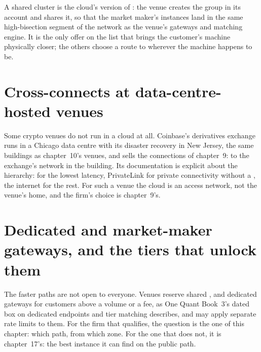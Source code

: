 A shared cluster  is the cloud's version of : the venue creates the group in its account and shares it, so that the
market maker's instances land in the same high-bisection segment of the network as the venue's gateways and matching engine. It is the only
offer on the list that brings the customer's machine physically closer; the others choose a route to wherever the machine happens to be.

\section{Cross-connects at data-centre-hosted venues}

Some crypto venues do not run in a cloud at all. Coinbase's derivatives exchange runs in a Chicago data centre with its disaster recovery in New
Jersey, the same buildings as chapter~10's venues, and sells the connections of chapter~9:  to the exchange's network in the building.
Its documentation is explicit about the hierarchy:  for the lowest latency, PrivateLink for private connectivity without a
, the internet for the rest. For such a venue the cloud is an access network, not the venue's home, and the firm's choice is chapter~9's.

\section{Dedicated and market-maker gateways, and the tiers that unlock them}

The faster paths are not open to everyone. Venues reserve shared ,  and dedicated gateways for customers above a
volume or a fee, as One Quant Book~3's dated box on dedicated endpoints and tier matching describes, and may apply separate rate limits to them.
For the firm that qualifies, the question is the one of this chapter: which path, from which zone. For the one that does not, it is chapter~17's:
the best instance it can find on the public path.

